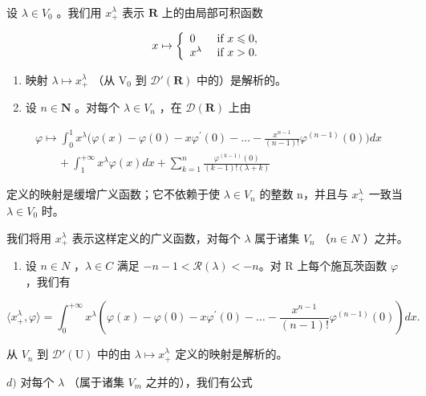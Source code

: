 设 \(\lambda\in V_{0}\) 。我们用 \(x_{+}^{\lambda}\) 表示 \(\mathbf{R}\) 上的由局部可积函数

\[
x \mapsto \left\{ \begin{array}{l l} 0 & \text { if } x \leqslant 0, \\ x ^ {\lambda} & \text { if } x > 0. \end{array} \right.
\]

\begin{enumerate}
\def\labelenumi{\alph{enumi})}
\item
  映射 \(\lambda \mapsto x_{+}^{\lambda}\) （从 \(\mathrm{V}_0\) 到 \(\mathcal{D}'(\mathbf{R})\) 中的）是解析的。
\item
  设 \(n \in \mathbf{N}\) 。对每个 \(\lambda \in V_n\) ，在 \(\mathcal{D}(\mathbf{R})\) 上由
\end{enumerate}

\[
\begin{array}{l} \varphi \mapsto \int_ {0} ^ {1} x ^ {\lambda} \Big (\varphi (x) - \varphi (0) - x \varphi^ {\prime} (0) - \dots - \frac {x ^ {n - 1}}{(n - 1) !} \varphi^ {(n - 1)} (0) \Big) d x \\ \qquad + \int_ {1} ^ {+ \infty} x ^ {\lambda} \varphi (x) d x + \sum_ {k = 1} ^ {n} \frac {\varphi^ {(k - 1)} (0)}{(k - 1) ! (\lambda + k)} \end{array}
\]

定义的映射是缓增广义函数；它不依赖于使 \(\lambda \in V_{n}\) 的整数 n，并且与 \(x_{+}^{\lambda}\) 一致当 \(\lambda \in V_{0}\) 时。

我们将用 \(x_{+}^{\lambda}\) 表示这样定义的广义函数，对每个 \(\lambda\) 属于诸集 \(V_{n}\) （\(n \in N\) ）之并。

\begin{enumerate}
\def\labelenumi{\alph{enumi})}
\setcounter{enumi}{2}
\tightlist
\item
  设 \(n \in N\) ，\(\lambda \in C\) 满足 \(-n - 1 < \mathcal{R}(\lambda) < -n\)。对 R 上每个施瓦茨函数 \(\varphi\) ，我们有
\end{enumerate}

\[
\langle x _ {+} ^ {\lambda}, \varphi \rangle = \int_ {0} ^ {+ \infty} x ^ {\lambda} \left(\varphi (x) - \varphi (0) - x \varphi^ {\prime} (0) - \dots - \frac {x ^ {n - 1}}{(n - 1) !} \varphi^ {(n - 1)} (0)\right) d x.
\]

  从 \(V_{n}\) 到 \(\mathcal{D}'(\mathrm{U})\) 中的由 \(\lambda\mapsto x_{+}^{\lambda}\) 定义的映射是解析的。

\(d)\) 对每个 \(\lambda\) （属于诸集 \(V_{m}\) 之并的），我们有公式

